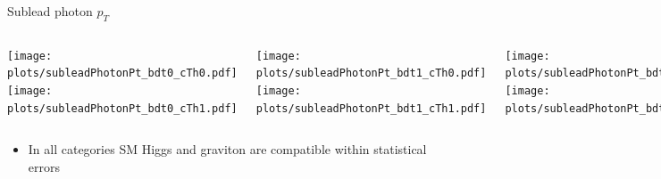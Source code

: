 \documentclass[8pt]{beamer}
\begin{document}
\begin{frame}{Sublead photon $p_T$}

  \begin{block}
   
     \begin{columns}
     
      \centering
     
      \column[t]{3.0cm}
      \texttt{[image: plots/subleadPhotonPt\_bdt0\_cTh0.pdf]} \\
      \texttt{[image: plots/subleadPhotonPt\_bdt0\_cTh1.pdf]} 
      
      \column[t]{3.0cm}
      \texttt{[image: plots/subleadPhotonPt\_bdt1\_cTh0.pdf]} \\
      \texttt{[image: plots/subleadPhotonPt\_bdt1\_cTh1.pdf]}
      
      \column[t]{3.0cm}
      \texttt{[image: plots/subleadPhotonPt\_bdt2\_cTh0.pdf]} \\
      \texttt{[image: plots/subleadPhotonPt\_bdt2\_cTh1.pdf]}
      
      \column[t]{3.0cm}
      \texttt{[image: plots/subleadPhotonPt\_bdt3\_cTh0.pdf]} \\
      \texttt{[image: plots/subleadPhotonPt\_bdt3\_cTh1.pdf]}
      
    \end{columns}
  
  \end{block}

  \begin{itemize}
    \item In all categories SM Higgs and graviton are compatible within statistical errors
  \end{itemize}
  
\end{frame}
\end{document}
